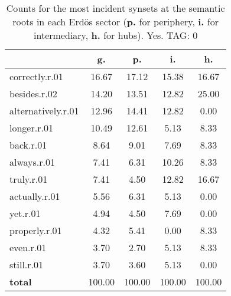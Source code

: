 \begin{table}[h!]
\begin{center}
\begin{tabular}{| l || c | c | c | c |}\hline
 & {\bf g.} & {\bf p.} & {\bf i.} & {\bf h.} \\\hline\hline
correctly.r.01 & 16.67  & 17.12  & 15.38  & 16.67 \\\hline
besides.r.02 & 14.20  & 13.51  & 12.82  & 25.00 \\\hline
alternatively.r.01 & 12.96  & 14.41  & 12.82  & 0.00 \\\hline
longer.r.01 & 10.49  & 12.61  & 5.13  & 8.33 \\\hline
back.r.01 & 8.64  & 9.01  & 7.69  & 8.33 \\\hline
always.r.01 & 7.41  & 6.31  & 10.26  & 8.33 \\\hline
truly.r.01 & 7.41  & 4.50  & 12.82  & 16.67 \\\hline
actually.r.01 & 5.56  & 6.31  & 5.13  & 0.00 \\\hline
yet.r.01 & 4.94  & 4.50  & 7.69  & 0.00 \\\hline
properly.r.01 & 4.32  & 5.41  & 0.00  & 8.33 \\\hline
even.r.01 & 3.70  & 2.70  & 5.13  & 8.33 \\\hline
still.r.01 & 3.70  & 3.60  & 5.13  & 0.00 \\\hline\hline
{{\bf total}} & 100.00  & 100.00  & 100.00  & 100.00 \\\hline
\end{tabular}
\caption{Counts for the most incident synsets at the semantic roots in each Erd\"os sector ({\bf p.} for periphery, {\bf i.} for intermediary, {\bf h.} for hubs). Yes. TAG: 0}
\end{center}
\end{table}